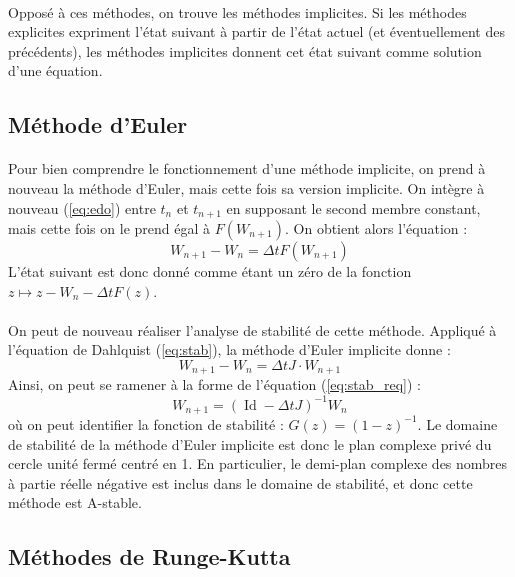   \paragraph{}
  Opposé à ces méthodes, on trouve les méthodes implicites.
  Si les méthodes explicites expriment l'état suivant à partir de l'état actuel (et éventuellement des précédents), les méthodes implicites donnent cet état suivant comme solution d'une équation.

  \subsection{Méthode d'Euler}

    \paragraph{}
    Pour bien comprendre le fonctionnement d'une méthode implicite, on prend à nouveau la méthode d'Euler, mais cette fois sa version implicite.
    On intègre à nouveau (\ref{eq:edo}) entre $t_n$ et $t_{n+1}$ en supposant le second membre constant, mais cette fois on le prend égal à $F\left(W_{n+1}\right)$.
    On obtient alors l'équation :
    \[W_{n+1} - W_n = \Delta tF\left(W_{n+1}\right)\]
    L'état suivant est donc donné comme étant un zéro de la fonction $z\mapsto z - W_n - \Delta tF\left(z\right)$.

    \paragraph{}
    On peut de nouveau réaliser l'analyse de stabilité de cette méthode.
    Appliqué à l'équation de Dahlquist (\ref{eq:stab}), la méthode d'Euler implicite donne :
    \[W_{n+1} - W_n = \Delta tJ\cdot W_{n+1}\]
    Ainsi, on peut se ramener à la forme de l'équation (\ref{eq:stab_req}) :
    \[W_{n+1} = \left(\operatorname{Id} - \Delta tJ\right)^{-1}W_n\]
    où on peut identifier la fonction de stabilité : $G\left(z\right) = \left(1-z\right)^{-1}$.
    Le domaine de stabilité de la méthode d'Euler implicite est donc le plan complexe privé du cercle unité fermé centré en 1.
    En particulier, le demi-plan complexe des nombres à partie réelle négative est inclus dans le domaine de stabilité, et donc cette méthode est A-stable.


  \subsection{Méthodes de Runge-Kutta}

